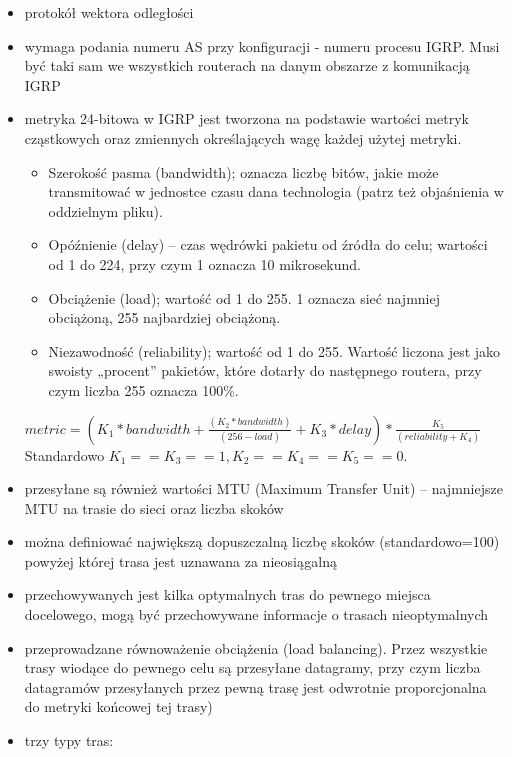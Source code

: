 \documentclass[../main.tex]{subfiles}
\begin{document}
    \begin{itemize}
        \item protokół wektora odległości
        \item wymaga podania numeru AS przy konfiguracji - numeru procesu IGRP. Musi być taki sam
        we wszystkich routerach na danym obszarze z komunikacją IGRP
        \item metryka 24-bitowa w IGRP jest tworzona na podstawie wartości metryk cząstkowych oraz zmiennych
        określających wagę każdej użytej metryki.
        \begin{itemize}
            \item Szerokość pasma (bandwidth); oznacza liczbę bitów, jakie może transmitować w
            jednostce czasu dana technologia (patrz też objaśnienia w oddzielnym pliku).
            \item Opóźnienie (delay) – czas wędrówki pakietu od źródła do celu; wartości od 1 do 224, przy
            czym 1 oznacza 10 mikrosekund.
            \item Obciążenie (load); wartość od 1 do 255. 1 oznacza sieć najmniej obciążoną, 255
            najbardziej obciążoną.
            \item Niezawodność (reliability); wartość od 1 do 255. Wartość liczona jest jako swoisty
            „procent” pakietów, które dotarły do następnego routera, przy czym liczba 255 oznacza
            100\%.
        \end{itemize}
        $metric = (K_1 * bandwidth + \frac{(K_2*bandwidth)}{(256 - load)} + K_3 * delay) *
        \frac{K_5}{(reliability + K_4)}$
        Standardowo $K_1 == K_3 == 1, K_2 == K_4 == K_5 == 0$.
        \item przesyłane są również wartości MTU (Maximum Transfer Unit) – najmniejsze MTU na trasie do sieci oraz liczba skoków
        \item można definiować największą dopuszczalną liczbę skoków (standardowo=100) powyżej której trasa jest uznawana za nieosiągalną
        \item przechowywanych jest kilka optymalnych tras do pewnego miejsca docelowego, mogą być przechowywane informacje o trasach nieoptymalnych
        \item przeprowadzane równoważenie obciążenia (load balancing). Przez wszystkie
        trasy wiodące do pewnego celu są przesyłane datagramy, przy czym liczba datagramów
        przesyłanych przez pewną trasę jest odwrotnie proporcjonalna do metryki końcowej tej
        trasy)
        \item trzy typy tras:

\end{itemize}
\end{document}
